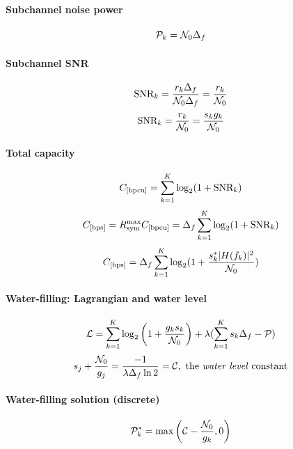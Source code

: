 \paragraph{Subchannel noise power}
\begin{equation}
{\cal P}_k = {\cal N}_0 \Delta_f
\label{eq:subchannelNoisePower}
\end{equation}

\paragraph{Subchannel SNR}
\begin{equation}
{\textrm{SNR}}_k = \frac{r_k \Delta_f}{{\cal N}_0 \Delta_f} = \frac{r_k}{{\cal N}_0}
\label{eq:snr_multicarrier}
\end{equation}
\begin{equation}
{\textrm{SNR}}_k = \frac{r_k}{{\cal N}_0} = \frac{s_k g_k}{{\cal N}_0}
\label{eq:snr_multicarrierFinal}
\end{equation}

\paragraph{Total capacity}
\begin{equation}
C_{[\textrm{bpcu}]} = \sum_{k=1}^K \log_2 (1 + {\textrm{SNR}}_k)
\label{eq:totalCapacity}
\end{equation}
\begin{equation}
C_{[\textrm{bps}]} = R_{\textrm{sym}}^{\textrm{max}} C_{[\textrm{bpcu}]} = \Delta_f \sum_{k=1}^K \log_2 (1 + {\textrm{SNR}}_k)
\label{eq:totalCapacityInbps}
\end{equation}
\begin{equation}
C_{[\textrm{bps}]} = \Delta_f \sum_{k=1}^K \log_2 (1 + \frac{s_k^* |H(f_k)|^2}{{\cal N}_0})
\label{eq:totalCapacityInbpsComplete}
\end{equation}

\paragraph{Water-filling: Lagrangian and water level}
\[
{\cal L} = \sum_{k=1}^K \log_2 \left(1 + \frac{g_{k} s_k}{{\cal N}_0}\right) + \lambda (\sum_{k=1}^K s_k \Delta_f - {\cal P})
\]
\begin{equation}
s_j +  \frac {{\cal N}_0} {g_j} = \frac{-1}{\lambda \Delta_f \ln 2} = {\cal C}, \textrm{ the \emph{water level} constant}
\label{eq:waterfill}
\end{equation}

\paragraph{Water-filling solution (discrete)}
\begin{equation}
{\cal P}_k^* = \max \left({\cal C} - \frac{{\cal N}_0}{g_k}, 0 \right)
\label{eq:waterfillingDiscreteSolution}
\end{equation}

